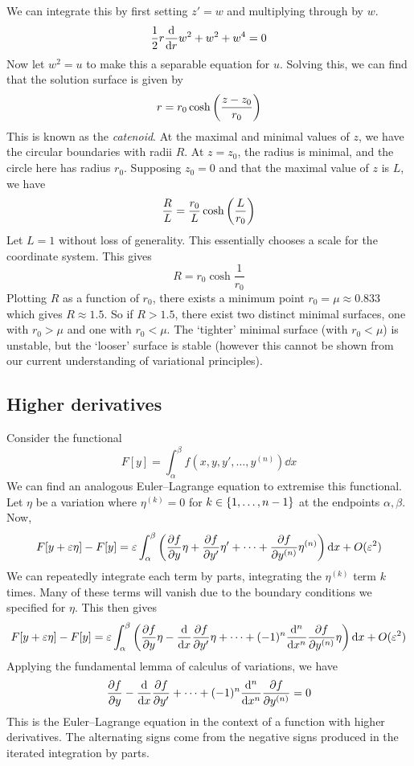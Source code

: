 We can integrate this by first setting \( z' = w \) and multiplying through by \( w \).
\[
	\frac{1}{2}r\dv{r} w^2 + w^2 + w^4 = 0
\]
Now let \( w^2 = u \) to make this a separable equation for \( u \).
Solving this, we can find that the solution surface is given by
\[
	r = r_0 \cosh \qty(\frac{z-z_0}{r_0})
\]
This is known as the \textit{catenoid}.
At the maximal and minimal values of \( z \), we have the circular boundaries with radii \( R \).
At \( z = z_0 \), the radius is minimal, and the circle here has radius \( r_0 \).
Supposing \( z_0 = 0 \) and that the maximal value of \( z \) is \( L \), we have
\[
	\frac{R}{L} = \frac{r_0}{L} \cosh \qty(\frac{L}{r_0})
\]
Let \( L = 1 \) without loss of generality.
This essentially chooses a scale for the coordinate system.
This gives
\[
	R = r_0 \cosh \frac{1}{r_0}
\]
Plotting \( R \) as a function of \( r_0 \), there exists a minimum point \( r_0 = \mu \approx 0.833 \) which gives \( R \approx 1.5 \).
So if \( R > 1.5 \), there exist two distinct minimal surfaces, one with \( r_0 > \mu \) and one with \( r_0 < \mu \).
The `tighter' minimal surface (with \( r_0 < \mu \)) is unstable, but the `looser' surface is stable (however this cannot be shown from our current understanding of variational principles).

\subsection{Higher derivatives}
Consider the functional
\[
	F[y] = \int_\alpha^\beta f(x,y,y',\dots,y^{(n)}) \dd{x}
\]
We can find an analogous Euler--Lagrange equation to extremise this functional.
Let \( \eta \) be a variation where \( \eta^{(k)} = 0 \) for \( k \in \qty{1, \dots, n-1} \) at the endpoints \( \alpha, \beta \).
Now,
\[
	F[y+\varepsilon \eta] - F[y] = \varepsilon\int_\alpha^\beta \qty(\pdv{f}{y} \eta + \pdv{f}{y'}\eta' + \dots + \pdv{f}{y^{(n)}}\eta^{(n)}) \dd{x} + O(\varepsilon^2)
\]
We can repeatedly integrate each term by parts, integrating the \( \eta^{(k)} \) term \( k \) times.
Many of these terms will vanish due to the boundary conditions we specified for \( \eta \).
This then gives
\[
	F[y+\varepsilon \eta] - F[y] = \varepsilon\int_\alpha^\beta \qty(\pdv{f}{y} \eta - \dv{x} \pdv{f}{y'}\eta + \dots + (-1)^n \dv[n]{x} \pdv{f}{y^{(n)}}\eta) \dd{x} + O(\varepsilon^2)
\]
Applying the fundamental lemma of calculus of variations, we have
\[
	\pdv{f}{y} - \dv{x} \pdv{f}{y'} + \dots + (-1)^n \dv[n]{x} \pdv{f}{y^{(n)}} = 0
\]
This is the Euler--Lagrange equation in the context of a function with higher derivatives.
The alternating signs come from the negative signs produced in the iterated integration by parts.

